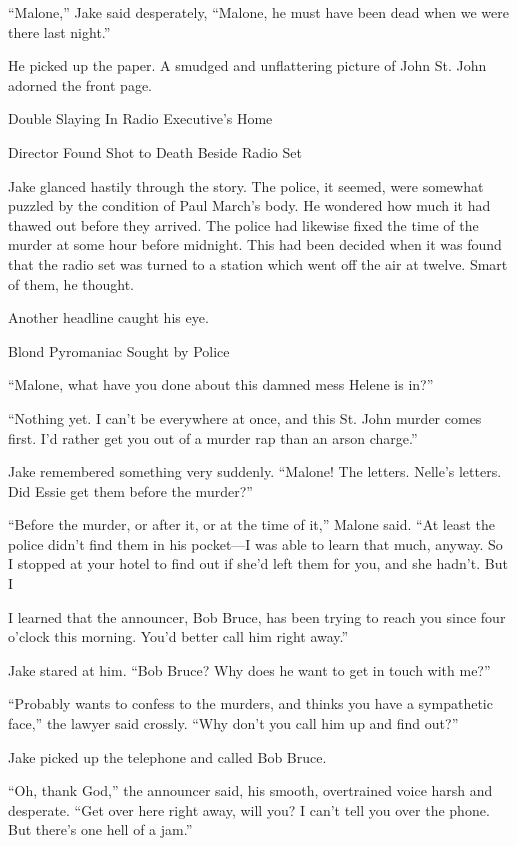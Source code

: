 \documentclass{novel}
\begin{document}
“Malone,” Jake said desperately, “Malone, he must have been dead when we were there last night.”

He picked up the paper. A smudged and unflattering picture of John St. John adorned the front page.

Double Slaying In Radio Executive’s Home

Director Found Shot to Death Beside Radio Set

Jake glanced hastily through the story. The police, it seemed, were somewhat puzzled by the condition of Paul March’s body. He wondered how much it had thawed out before they arrived. The police had likewise fixed the time of the murder at some hour before midnight. This had been decided when it was found that the radio set was turned to a station which went off the air at twelve. Smart of them, he thought.

Another headline caught his eye.

Blond Pyromaniac Sought by Police

“Malone, what have you done about this damned mess Helene is in?”

“Nothing yet. I can’t be everywhere at once, and this St. John murder comes first. I’d rather get you out of a murder rap than an arson charge.”

Jake remembered something very suddenly. “Malone! The letters. Nelle’s letters. Did Essie get them before the murder?”

“Before the murder, or after it, or at the time of it,” Malone said. “At least the police didn’t find them in his pocket—I was able to learn that much, anyway. So I stopped at your hotel to find out if she’d left them for you, and she hadn’t. But I

I learned that the announcer, Bob Bruce, has been trying to reach you since four o’clock this morning. You’d better call him right away.”

Jake stared at him. “Bob Bruce? Why does he want to get in touch with me?”

“Probably wants to confess to the murders, and thinks you have a sympathetic face,” the lawyer said crossly. “Why don’t you call him up and find out?”

Jake picked up the telephone and called Bob Bruce.

“Oh, thank God,” the announcer said, his smooth, overtrained voice harsh and desperate. “Get over here right away, will you? I can’t tell you over the phone. But there’s one hell of a jam.”
\end{document}
